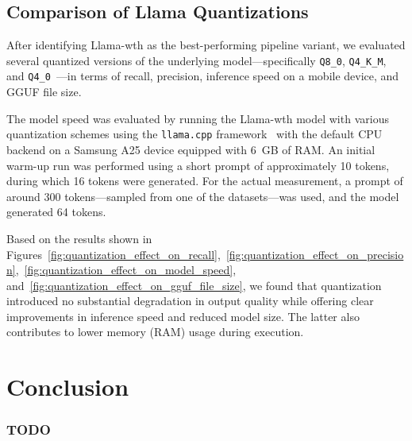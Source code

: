 \documentclass[licencjacka,en]{pracamgr}
\begin{document}
\section{Comparison of Llama Quantizations}

After identifying Llama-wth as the best-performing pipeline variant, we evaluated several quantized versions of the underlying model—specifically \texttt{Q8\_0}, \texttt{Q4\_K\_M}, and \texttt{Q4\_0}~\cite{llama-cpp-quantization}—in terms of recall, precision, inference speed on a mobile device, and GGUF file size. 

The model speed was evaluated by running the Llama-wth model with various quantization schemes using the \texttt{llama.cpp} framework~\cite{llama-cpp} with the default CPU backend on a Samsung A25 device equipped with 6~GB of RAM. An initial warm-up run was performed using a short prompt of approximately 10 tokens, during which 16 tokens were generated. For the actual measurement, a prompt of around 300 tokens—sampled from one of the datasets—was used, and the model generated 64 tokens.

Based on the results shown in Figures~\ref{fig:quantization_effect_on_recall},~\ref{fig:quantization_effect_on_precision},~\ref{fig:quantization_effect_on_model_speed}, and~\ref{fig:quantization_effect_on_gguf_file_size}, we found that quantization introduced no substantial degradation in output quality while offering clear improvements in inference speed and reduced model size. The latter also contributes to lower memory (RAM) usage during execution.

\chapter{Conclusion}
\subsection{TODO}
\end{document}
